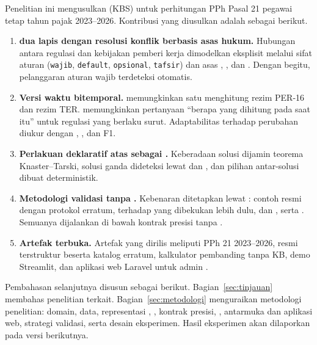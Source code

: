 Penelitian ini mengusulkan  (KBS) untuk perhitungan PPh Pasal 21 pegawai tetap tahun pajak 2023--2026. Kontribusi yang diusulkan adalah sebagai berikut.
\begin{enumerate}[leftmargin=*,nosep]
  \item \textbf{ dua lapis dengan resolusi konflik berbasis asas hukum.} Hubungan antara regulasi dan kebijakan pemberi kerja dimodelkan eksplisit melalui sifat aturan (\texttt{wajib}, \texttt{default}, \texttt{opsional}, \texttt{tafsir}) dan asas , , dan . Dengan begitu, pelanggaran aturan wajib terdeteksi otomatis.
  \item \textbf{Versi waktu bitemporal.}  memungkinkan satu  menghitung rezim PER-16 dan rezim TER.  memungkinkan pertanyaan ``berapa yang dihitung pada saat itu'' untuk regulasi yang berlaku surut. Adaptabilitas terhadap perubahan diukur dengan , , dan F1.
  \item \textbf{Perlakuan deklaratif atas  sebagai .} Keberadaan solusi dijamin teorema Knaster--Tarski, solusi ganda dideteksi lewat  dan , dan pilihan antar-solusi dibuat deterministik.
  \item \textbf{Metodologi validasi tanpa .} Kebenaran ditetapkan lewat : contoh resmi dengan protokol erratum,  terhadap  yang dibekukan lebih dulu,  dan , serta . Semuanya dijalankan di bawah kontrak presisi tanpa .
  \item \textbf{Artefak terbuka.} Artefak yang dirilis meliputi  PPh 21 2023--2026,  resmi terstruktur beserta katalog erratum, kalkulator pembanding tanpa KB, demo Streamlit, dan aplikasi web Laravel untuk admin .
\end{enumerate}

Pembahasan selanjutnya disusun sebagai berikut. Bagian~\ref{sec:tinjauan} membahas penelitian terkait. Bagian~\ref{sec:metodologi} menguraikan metodologi penelitian: domain, data, representasi , , kontrak presisi, , antarmuka dan aplikasi web, strategi validasi, serta desain eksperimen. Hasil eksperimen akan dilaporkan pada versi berikutnya.
